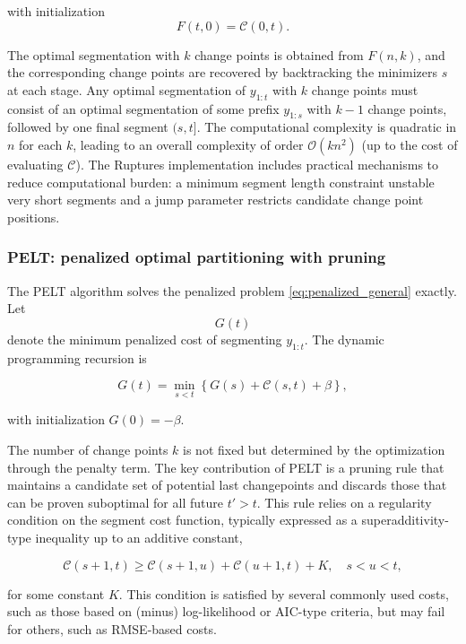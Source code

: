 \documentclass[preprints,article,submit,pdftex,moreauthors]{Definitions/mdpi}
\begin{document}
with initialization
\[
F(t,0) = \mathcal{C}(0,t).
\]

The optimal segmentation with $k$ change points is obtained from $F(n,k)$, and the corresponding change points are recovered by backtracking the minimizers $s$ at each stage.
Any optimal segmentation of $y_{1:t}$ with $k$ change points must consist of an optimal segmentation of some prefix $y_{1:s}$ with $k-1$ change points, followed by one final segment $(s,t]$.
The computational complexity is quadratic in $n$ for each $k$, leading to an overall complexity of order $\mathcal{O}(k n^2)$ (up to the cost of evaluating $\mathcal{C}$). 
The Ruptures implementation includes practical mechanisms to reduce computational burden: a minimum segment length constraint unstable very short segments and a jump parameter restricts candidate change point positions.

\subsubsection{PELT: penalized optimal partitioning with pruning}
The PELT algorithm \cite{KFE12} solves the penalized problem \eqref{eq:penalized_general} exactly. 
Let
\[
G(t)
\]
denote the minimum penalized cost of segmenting $y_{1:t}$. The dynamic programming recursion is

\begin{equation}
	\label{eq:PELT_recursion_consistent}
	G(t)
	=
	\min_{s < t}
	\left\{
	G(s)
	+
	\mathcal{C}(s,t)
	+
	\beta
	\right\},
\end{equation}

\noindent with initialization $G(0) = -\beta$.

The number of change points $k$ is not fixed but determined by the optimization through the penalty term.
The key contribution of PELT is a pruning rule that maintains a candidate set of potential last changepoints and discards those that can be proven suboptimal for all future $t' > t$. This rule relies on a regularity condition on the segment cost function, typically expressed as a superadditivity-type inequality up to an additive constant,

\begin{equation}
\mathcal{C}(s+1,t) \ge \mathcal{C}(s+1,u) + \mathcal{C}(u+1,t) + K, \quad s < u < t,
\end{equation}

\noindent for some constant $K$. This condition is satisfied by several commonly used costs, such as those based on (minus) log-likelihood or AIC-type criteria, but may fail for others, such as RMSE-based costs.
\end{document}
